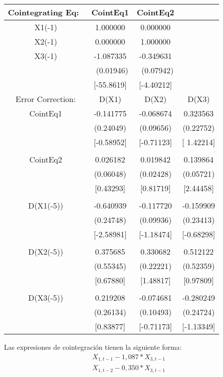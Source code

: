 \begin{table}[H]
\centering
\begin{tabular}{cccc}\hline\hline
 Cointegrating Eq:~ &  CointEq1 &  CointEq2 &  \\ \hline\hline
X1(-1) & 1.000000 & 0.000000 &  \\ 
X2(-1) & 0.000000 & 1.000000 &  \\ 
X3(-1) & -1.087335 & -0.349631 & \\ 
       & ~(0.01946) &  ~(0.07942) &  \\ 
       & [-55.8619] & [-4.40212] &  \\ \hline\hline
Error Correction: & D(X1) & D(X2) & D(X3) \\ \hline\hline
CointEq1 & -0.141775 & -0.068674 & 0.323563 \\
 & (0.24049) & (0.09656) & (0.22752) \\
 & [-0.58952] & [-0.71123] & [ 1.42214] \\
 & & & \\
CointEq2 & 0.026182 & 0.019842 & 0.139864 \\
& (0.06048) & (0.02428) & (0.05721) \\
& [0.43293] & [0.81719] & [2.44458] \\
& & & \\
D(X1(-5)) & -0.640939 & -0.117720 & -0.159909 \\
& (0.24748) & (0.09936) & (0.23413) \\
& [-2.58981] & [-1.18474] & [-0.68298] \\
& & & \\
D(X2(-5)) & 0.375685 & 0.330682 & 0.512122 \\
 & (0.55345) & (0.22221) & (0.52359) \\
 & [0.67880] & [1.48817] & [0.97809] \\
 & & & \\
D(X3(-5)) & 0.219208 & -0.074681 & -0.280249 \\
& (0.26134) & (0.10493) & (0.24724) \\
& [0.83877] & [-0.71173] & [-1.13349] \\ \hline\hline
\end{tabular}
\label{tab11}
\end{table}

Las expresiones de cointegraci\'{o}n tienen la siguiente forma:
\[
\begin{array}{l}
 X_{1,t-1}-1,087\ast X_{3,t-1} \\ 
 X_{1,t-2}-0,350\ast X_{3,t-1} \\ 
 \end{array}
\]

